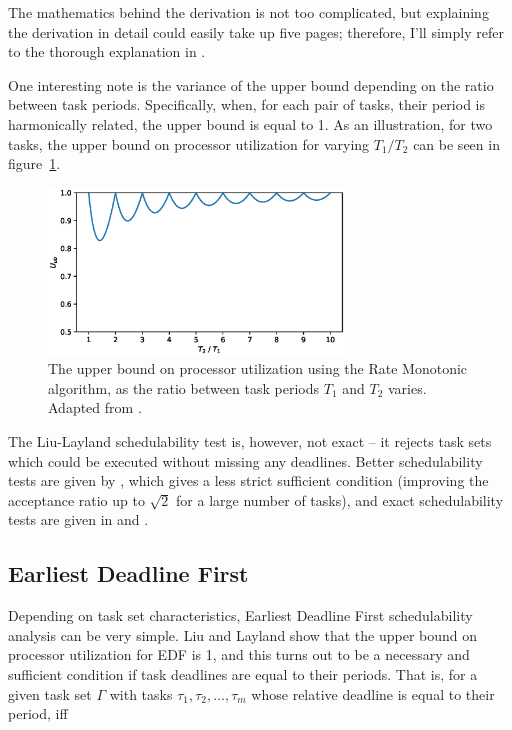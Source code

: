 \documentclass[twoside]{uva-inf-bachelor-thesis}
\begin{document}
The mathematics behind the derivation is not too complicated, but explaining the derivation in detail could easily take up five pages; therefore, I'll simply refer to the thorough explanation in \textcite[pp. 90-97]{buttazzo2011hard}.

One interesting note is the variance of the upper bound depending on the ratio between task periods. Specifically, when, for each pair of tasks, their period is harmonically related\cite[\S 4]{Buttazzo2005}, the upper bound is equal to 1. As an illustration, for two tasks, the upper bound on processor utilization for varying $T_1 / T_2$ can be seen in figure~\ref{fig:ubk}.

\begin{figure}[htpb]
    \centering
    \includegraphics[width=0.7\textwidth]{ub_rm_2tasks.eps}
    \caption{The upper bound on processor utilization using the Rate Monotonic algorithm, as the ratio between task periods $T_1$ and $T_2$ varies. Adapted from \textcite{buttazzo2011hard}.}
    \label{fig:ubk}
\end{figure}

The Liu-Layland schedulability test is, however, not exact -- it rejects task sets which could be executed without missing any deadlines. Better schedulability tests are given by \textcite{Bini2003}, which gives a less strict sufficient condition (improving the acceptance ratio up to $\sqrt{2}$ for a large number of tasks), and exact schedulability tests are given in \textcite{Lehoczky1989} and \textcite{Audsley1993}.

\subsection{Earliest Deadline First}
Depending on task set characteristics, Earliest Deadline First schedulability analysis can be very simple. Liu and Layland show that the upper bound on processor utilization for EDF is 1, and this turns out to be a necessary and sufficient condition if task deadlines are equal to their periods. That is, for a given task set $\Gamma$ with tasks $\tau_1, \tau_2, \ldots, \tau_m$ whose relative deadline is equal to their period, iff
\end{document}
